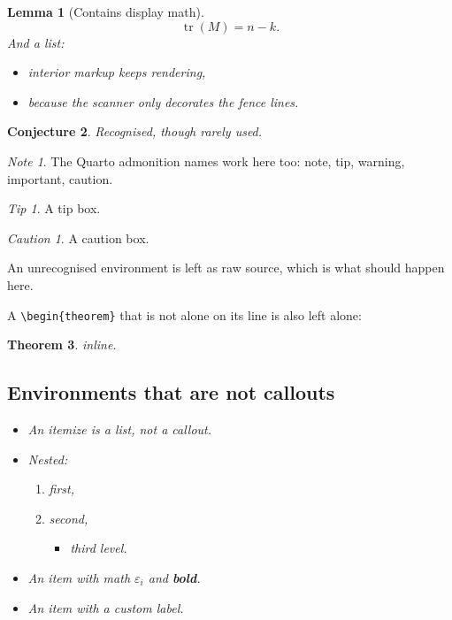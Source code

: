 \documentclass[11pt]{article}
\newtheorem{theorem}{Theorem}
\newtheorem{lemma}[theorem]{Lemma}
\newtheorem{conjecture}[theorem]{Conjecture}
\theoremstyle{definition}
\theoremstyle{remark}
\newtheorem*{note}{Note}
\newtheorem*{tip}{Tip}
\newtheorem*{caution}{Caution}
\begin{document}
{\begin{lemma}[Contains display math]
\begin{equation}
    \operatorname{tr}(M) = n - k .
    \label{eq:trace}
\end{equation}
And a list:
\begin{itemize}
    \item interior markup keeps rendering,
    \item because the scanner only decorates the fence lines.
\end{itemize}
\end{lemma}

\begin{conjecture}
Recognised, though rarely used.
\end{conjecture}

\begin{note}
The Quarto admonition names work here too: note, tip, warning, important,
caution.
\end{note}

\begin{tip}
A tip box.
\end{tip}

\begin{caution}
A caution box.
\end{caution}

\begin{bogus}
An unrecognised environment is left as raw source, which is what should happen
here.
\end{bogus}

A \verb|\begin{theorem}| that is not alone on its line is also left alone: \begin{theorem} inline.

\subsection{Environments that are not callouts}

\begin{itemize}
    \item An itemize is a list, not a callout.
    \item Nested:
    \begin{enumerate}
        \item first,
        \item second,
        \begin{itemize}
            \item third level.
        \end{itemize}
    \end{enumerate}
    \item An item with math $\varepsilon_i$ and \textbf{bold}.
    \item[custom] An item with a custom label.
\end{itemize}


\end{theorem}}
\end{document}
